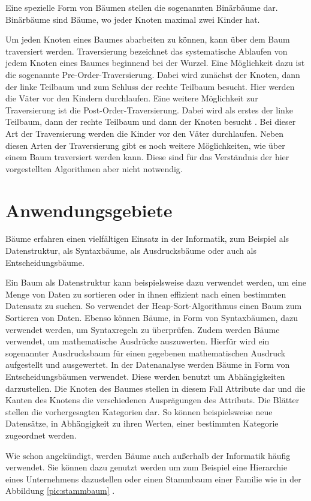 Eine spezielle Form von Bäumen stellen die sogenannten Binärbäume dar. 
Binärbäume sind Bäume, wo jeder Knoten maximal zwei Kinder hat.

Um jeden Knoten eines Baumes abarbeiten zu können, kann über dem Baum 
traversiert werden. Traversierung bezeichnet das systematische Ablaufen 
von jedem Knoten eines Baumes beginnend bei der Wurzel. Eine Möglichkeit dazu ist die sogenannte
Pre-Order-Traversierung. Dabei wird zunächst der Knoten, dann der linke Teilbaum
und zum Schluss der rechte Teilbaum besucht. Hier werden die Väter vor den
Kindern durchlaufen. Eine weitere Möglichkeit zur Traversierung ist die 
Post-Order-Traversierung. Dabei wird als erstes der linke Teilbaum, dann der 
rechte Teilbaum und dann der Knoten besucht \cite[S. 22]{q4}. Bei dieser Art der 
Traversierung werden die Kinder vor den Väter durchlaufen. Neben diesen Arten
der Traversierung gibt es noch weitere Möglichkeiten, wie über einem 
Baum traversiert werden kann. Diese sind für das Verständnis der hier 
vorgestellten Algorithmen aber nicht notwendig.


\section{Anwendungsgebiete}

Bäume erfahren einen vielfältigen Einsatz in der Informatik, zum Beispiel 
als Datenstruktur, als Syntaxbäume, als Ausdrucksbäume oder auch als 
Entscheidungsbäume.

Ein Baum als Datenstruktur kann beispielsweise dazu verwendet werden, 
um eine Menge von Daten zu sortieren oder in ihnen effizient nach einen 
bestimmten Datensatz zu suchen. So verwendet der Heap-Sort-Algorithmus 
einen Baum zum Sortieren von Daten. Ebenso können Bäume, in Form von Syntaxbäumen, dazu verwendet 
werden, um Syntaxregeln zu überprüfen. Zudem werden Bäume verwendet, um mathematische 
Ausdrücke auszuwerten. Hierfür wird ein sogenannter Ausdrucksbaum für einen 
gegebenen mathematischen Ausdruck aufgestellt und ausgewertet. In der 
Datenanalyse werden Bäume in Form von Entscheidungsbäumen verwendet. 
Diese werden benutzt um Abhängigkeiten darzustellen. Die Knoten des Baumes stellen in diesem Fall Attribute dar und die Kanten des Knotens
die verschiedenen Ausprägungen des Attributs. Die Blätter stellen die vorhergesagten Kategorien dar. So können beispielsweise neue 
Datensätze, in Abhängigkeit zu ihren Werten, einer bestimmten Kategorie 
zugeordnet werden.

Wie schon angekündigt, werden Bäume auch außerhalb der Informatik häufig verwendet. Sie können 
dazu genutzt werden um zum Beispiel eine Hierarchie eines Unternehmens
dazustellen oder einen Stammbaum einer 
Familie wie in der Abbildung \ref{pic:stammbaum} \cite[S. 2]{q4}.

